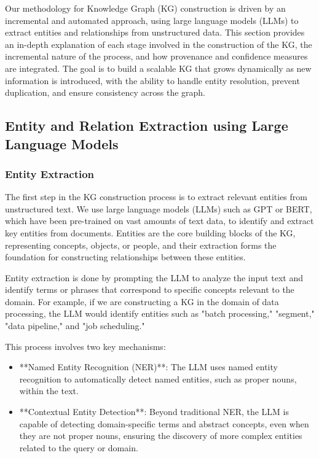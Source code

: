 Our methodology for Knowledge Graph (KG) construction is driven by an incremental and automated approach, using large language models (LLMs) to extract entities and relationships from unstructured data. This section provides an in-depth explanation of each stage involved in the construction of the KG, the incremental nature of the process, and how provenance and confidence measures are integrated. The goal is to build a scalable KG that grows dynamically as new information is introduced, with the ability to handle entity resolution, prevent duplication, and ensure consistency across the graph.

\subsection{Entity and Relation Extraction using Large Language Models}

\subsubsection{Entity Extraction}

The first step in the KG construction process is to extract relevant entities from unstructured text. We use large language models (LLMs) such as GPT or BERT, which have been pre-trained on vast amounts of text data, to identify and extract key entities from documents. Entities are the core building blocks of the KG, representing concepts, objects, or people, and their extraction forms the foundation for constructing relationships between these entities.

Entity extraction is done by prompting the LLM to analyze the input text and identify terms or phrases that correspond to specific concepts relevant to the domain. For example, if we are constructing a KG in the domain of data processing, the LLM would identify entities such as "batch processing," "segment," "data pipeline," and "job scheduling."

This process involves two key mechanisms:
\begin{itemize}
    \item **Named Entity Recognition (NER)**: The LLM uses named entity recognition to automatically detect named entities, such as proper nouns, within the text.
    \item **Contextual Entity Detection**: Beyond traditional NER, the LLM is capable of detecting domain-specific terms and abstract concepts, even when they are not proper nouns, ensuring the discovery of more complex entities related to the query or domain.
\end{itemize}

